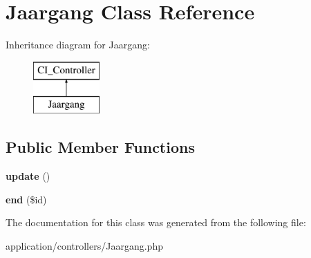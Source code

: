 \hypertarget{class_jaargang}{}\section{Jaargang Class Reference}
\label{class_jaargang}
Inheritance diagram for Jaargang\+:\begin{figure}[H]
\begin{center}
\leavevmode
\includegraphics[height=2.000000cm]{class_jaargang}
\end{center}
\end{figure}
\subsection*{Public Member Functions}
\begin{DoxyCompactItemize}
\item 
\mbox{\label{class_jaargang_a842e4774e3b3601a005b995c02f7e883}} 
{\bfseries update} ()
\item 
\mbox{\label{class_jaargang_a96b12cad9ede16ef3e87c74cf77b894b}} 
{\bfseries end} (\$id)
\end{DoxyCompactItemize}


The documentation for this class was generated from the following file\+:\begin{DoxyCompactItemize}
\item 
application/controllers/Jaargang.\+php\end{DoxyCompactItemize}
